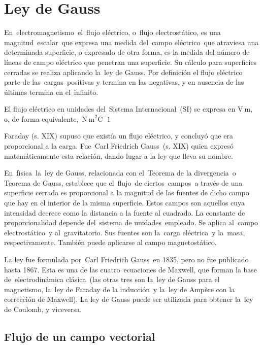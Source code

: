 \chapter{Ley de Gauss}

\begin{miparrafo}

En electromagnetismo el flujo eléctrico, o flujo electrostático, es una magnitud escalar que expresa una medida del campo eléctrico que atraviesa una determinada superficie, o expresado de otra forma, es la medida del número de líneas de campo eléctrico que penetran una superficie. Su cálculo para superficies cerradas se realiza aplicando la ley de Gauss. Por definición el flujo eléctrico parte de las cargas positivas y termina en las negativas, y en ausencia de las últimas termina en el infinito. 


El flujo eléctrico en unidades del Sistema Internacional (SI) se expresa en $\mathrm{V\ m}$, o, de forma equivalente, $\mathrm{N\ m}^2 \mathrm{C}^{-}1$ 


Faraday (s. XIX) supuso que existía un flujo eléctrico, y concluyó que era proporcional a la carga. Fue Carl Friedrich Gauss (s. XIX) quien expresó matemáticamente esta relación, dando lugar a la ley que lleva su nombre.


En física la ley de Gauss, relacionada con el Teorema de la divergencia o Teorema de Gauss, establece que el flujo de ciertos campos a través de una superficie cerrada es proporcional a la magnitud de las fuentes de dicho campo que hay en el interior de la misma superficie. Estos campos son aquellos cuya intensidad decrece como la distancia a la fuente al cuadrado. La constante de proporcionalidad depende del sistema de unidades empleado.
Se aplica al campo electrostático y al gravitatorio. Sus fuentes son la carga eléctrica y la masa, respectivamente. También puede aplicarse al campo magnetostático.

La ley fue formulada por Carl Friedrich Gauss en 1835, pero no fue publicado hasta 1867. Esta es una de las cuatro ecuaciones de Maxwell, que forman la base de electrodinámica clásica (las otras tres son la ley de Gauss para el magnetismo, la ley de Faraday de la inducción y la ley de Ampère con la corrección de Maxwell). La ley de Gauss puede ser utilizada para obtener la ley de Coulomb, y viceversa.

\end{miparrafo}

\section{Flujo de un campo vectorial}

